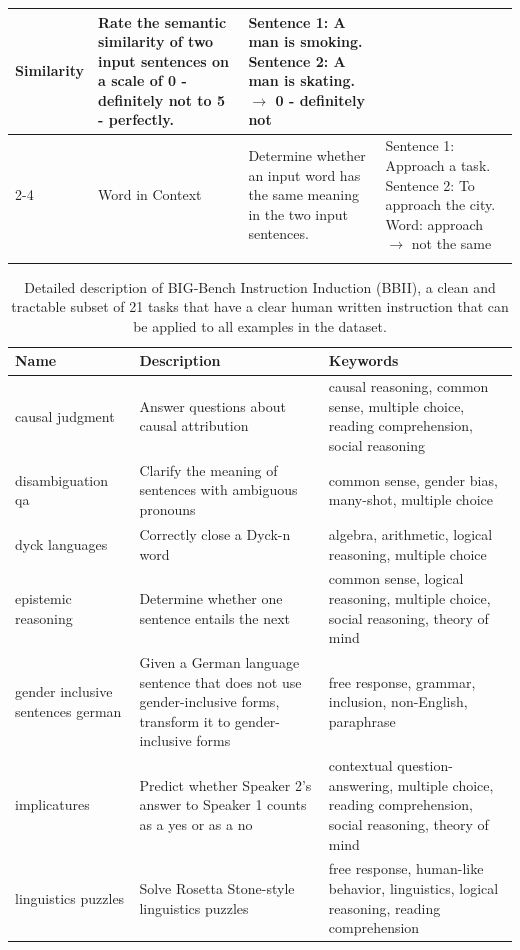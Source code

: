 \begin{table}[H]
\begin{tabular}{@{}p{}@{}p{}@{}p{}p{}@{}}
Similarity & Rate the semantic similarity of two input sentences on a scale of 0 - definitely not to 5 - perfectly. & Sentence 1: A man is smoking. Sentence 2: A man is skating. $\rightarrow$  0 - definitely not \\
\cmidrule{2-4}
& Word in Context & Determine whether an input word has the same meaning in the two input sentences. & Sentence 1: Approach a task. Sentence 2: To approach the city. Word: approach  $\rightarrow$  not the same \\
\bottomrule
\\
\end{tabular}
\label{tab:instruct_tasks_original}
\end{table}


\begin{table}[H]
\caption{Detailed description of BIG-Bench Instruction Induction (BBII), a clean and tractable subset of 21 tasks that have a clear human written instruction that can be applied to all examples in the dataset.}
\label{table:bbii_desc}
\small
\centering
\begin{tabular}{m{2.5cm}m{5.5cm}m{5cm}}
\toprule
\textbf{Name} & \textbf{Description} & \textbf{Keywords} \\
\midrule
causal judgment & Answer questions about causal attribution & causal reasoning, common sense, multiple choice, reading comprehension, social reasoning \\
\midrule
disambiguation qa & Clarify the meaning of sentences with ambiguous pronouns & common sense, gender bias, many-shot, multiple choice \\
\midrule
dyck languages &  Correctly close a Dyck-n word & algebra, arithmetic, logical reasoning, multiple choice \\
\midrule
epistemic reasoning & Determine whether one sentence entails the next & common sense, logical reasoning, multiple choice, social reasoning, theory of mind \\
\midrule
gender inclusive sentences german & Given a German language sentence that does not use gender-inclusive forms, transform it to gender-inclusive forms & free response, grammar, inclusion, non-English, paraphrase \\
\midrule
implicatures & Predict whether Speaker 2's answer to Speaker 1 counts as a yes or as a no & contextual question-answering, multiple choice, reading comprehension, social reasoning, theory of mind \\
\midrule
linguistics puzzles & Solve Rosetta Stone-style linguistics puzzles & free response, human-like behavior, linguistics, logical reasoning, reading comprehension \\

\end{tabular}
\end{table}
